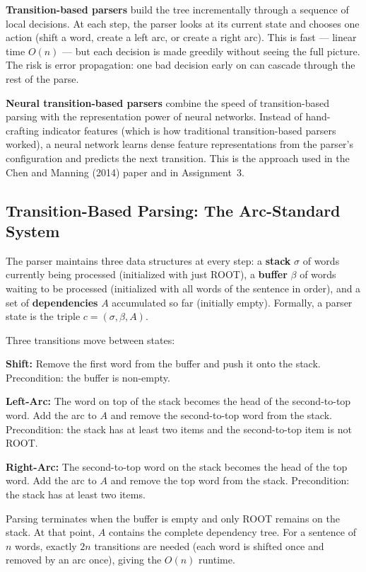 \documentclass[11pt]{article}
\begin{document}
\textbf{Transition-based parsers} build the tree incrementally through a sequence of local decisions. At each step, the parser looks at its current state and chooses one action (shift a word, create a left arc, or create a right arc). This is fast --- linear time $O(n)$ --- but each decision is made greedily without seeing the full picture. The risk is error propagation: one bad decision early on can cascade through the rest of the parse.

\textbf{Neural transition-based parsers} combine the speed of transition-based parsing with the representation power of neural networks. Instead of hand-crafting indicator features (which is how traditional transition-based parsers worked), a neural network learns dense feature representations from the parser's configuration and predicts the next transition. This is the approach used in the Chen and Manning (2014) paper and in Assignment~3.

\subsection{Transition-Based Parsing: The Arc-Standard System}

The parser maintains three data structures at every step: a \textbf{stack} $\sigma$ of words currently being processed (initialized with just ROOT), a \textbf{buffer} $\beta$ of words waiting to be processed (initialized with all words of the sentence in order), and a set of \textbf{dependencies} $A$ accumulated so far (initially empty). Formally, a parser state is the triple $c = (\sigma, \beta, A)$.

Three transitions move between states:

\textbf{Shift:} Remove the first word from the buffer and push it onto the stack. Precondition: the buffer is non-empty.

\textbf{Left-Arc:} The word on top of the stack becomes the head of the second-to-top word. Add the arc to $A$ and remove the second-to-top word from the stack. Precondition: the stack has at least two items and the second-to-top item is not ROOT.

\textbf{Right-Arc:} The second-to-top word on the stack becomes the head of the top word. Add the arc to $A$ and remove the top word from the stack. Precondition: the stack has at least two items.

Parsing terminates when the buffer is empty and only ROOT remains on the stack. At that point, $A$ contains the complete dependency tree. For a sentence of $n$ words, exactly $2n$ transitions are needed (each word is shifted once and removed by an arc once), giving the $O(n)$ runtime.
\end{document}
